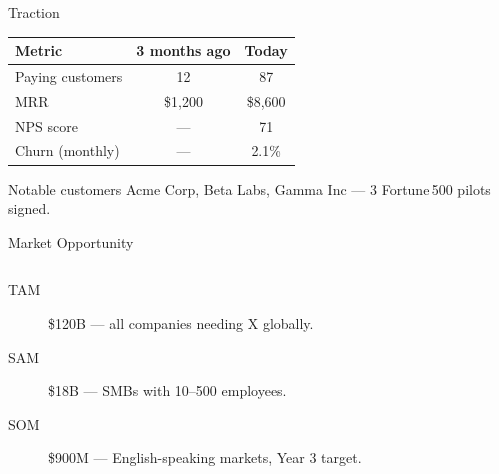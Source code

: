 \documentclass[aspectratio=169]{beamer}
\begin{document}
\begin{frame}{Traction}
  \begin{table}
    \centering
    \begin{tabular}{lcc}
      \toprule
      \textbf{Metric}        & \textbf{3 months ago} & \textbf{Today} \\
      \midrule
      Paying customers       & 12                    & 87             \\
      MRR                    & \$1{,}200             & \$8{,}600      \\
      NPS score              & ---                   & 71             \\
      Churn (monthly)        & ---                   & 2.1\%          \\
      \bottomrule
    \end{tabular}
  \end{table}

  \vspace{0.5em}
  \begin{block}{Notable customers}
    Acme Corp, Beta Labs, Gamma Inc --- 3 Fortune\,500 pilots signed.
  \end{block}
\end{frame}

\begin{frame}{Market Opportunity}
  \begin{columns}[T]
    \begin{description}
      \item[TAM] \$120B --- all companies needing X globally.
      \item[SAM] \$18B --- SMBs with 10--500 employees.
      \item[SOM] \$900M --- English-speaking markets, Year 3 target.
    \end{description}

  \end{columns}
\end{frame}
\end{document}
